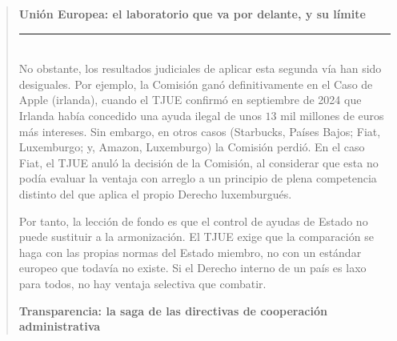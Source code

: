 \documentclass[10pt,a4paper]{article}
\newenvironment{specialblock}[1]{%
      \begin{quote} %
      \small %
      \noindent\textbf{#1}\\[-0.3em] %
      \rule{\linewidth}{0.4pt}\\[0.6em]}{
      \end{quote}}
\begin{document}
\begin{specialblock}{\textbf{Unión Europea}: el laboratorio que va por delante, y su límite}
    No obstante, los resultados judiciales de aplicar esta segunda vía han sido desiguales. Por ejemplo, la Comisión ganó definitivamente en el Caso de Apple (irlanda), cuando el TJUE confirmó en septiembre de 2024 que Irlanda había concedido una ayuda ilegal de unos $13$ mil millones de euros más intereses. Sin embargo, en otros casos (Starbucks, Países Bajos; Fiat, Luxemburgo; y, Amazon, Luxemburgo) la Comisión perdió. En el caso Fiat, el TJUE anuló la decisión de la Comisión, al considerar que esta no podía evaluar la ventaja con arreglo a un principio de plena competencia distinto del que aplica el propio Derecho luxemburgués. 
    
    Por tanto, la lección de fondo es que el control de ayudas de Estado no puede sustituir a la armonización. El TJUE exige que la comparación se haga con las propias normas del Estado miembro, no con un estándar europeo que todavía no existe. Si el Derecho interno de un país es laxo para todos, no hay ventaja selectiva que combatir.
    
    \textbf{Transparencia: la saga de las directivas de cooperación administrativa}
    

\end{specialblock}
\end{document}
